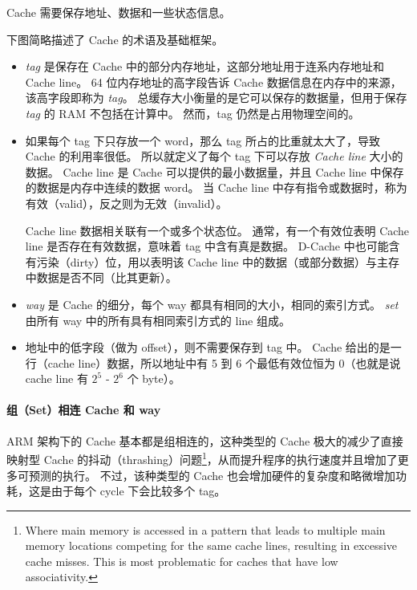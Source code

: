 Cache 需要保存地址、数据和一些状态信息。

下图简略描述了 Cache 的术语及基础框架。


\begin{itemize}
  \item \textit{tag} 是保存在 Cache 中的部分内存地址，这部分地址用于连系内存地址和 Cache line。
    64 位内存地址的高字段告诉 Cache 数据信息在内存中的来源，该高字段即称为 \textit{tag}。
    总缓存大小衡量的是它可以保存的数据量，但用于保存 \textit{tag} 的 RAM 不包括在计算中。
    然而，tag 仍然是占用物理空间的。
  \item 如果每个 tag 下只存放一个 word，那么 tag 所占的比重就太大了，导致 Cache 的利用率很低。
    所以就定义了每个 tag 下可以存放 \textit{Cache line} 大小的数据。
    Cache line 是 Cache 可以提供的最小数据量，并且 Cache line 中保存的数据是内存中连续的数据 word。
    当 Cache line 中存有指令或数据时，称为有效（valid），反之则为无效（invalid）。

    Cache line 数据相关联有一个或多个状态位。
    通常，有一个有效位表明 Cache line 是否存在有效数据，意味着 tag 中含有真是数据。
    D-Cache 中也可能含有污染（dirty）位，用以表明该 Cache line 中的数据（或部分数据）与主存中数据是否不同（比其更新）。
  \item \textit{way} 是 Cache 的细分，每个 way 都具有相同的大小，相同的索引方式。
    \textit{set} 由所有 way 中的所有具有相同索引方式的 line 组成。
  \item 地址中的低字段（做为 offset），则不需要保存到 tag 中。
    Cache 给出的是一行（cache line）数据，所以地址中有 5 到 6 个最低有效位恒为 0（也就是说 cache line 有 $2^5$ - $2^6$ 个 byte）。
\end{itemize}

\paragraph*{组（Set）相连 Cache 和 way}

ARM 架构下的 Cache 基本都是组相连的，这种类型的 Cache 极大的减少了直接映射型 Cache 的抖动（thrashing）问题\footnote{
Where main memory is accessed in a pattern that leads to multiple main memory locations competing for the same cache lines, resulting in excessive cache misses.
This is most problematic for caches that have low associativity.
 }，从而提升程序的执行速度并且增加了更多可预测的执行。
不过，该种类型的 Cache 也会增加硬件的复杂度和略微增加功耗，这是由于每个 cycle 下会比较多个 tag。

